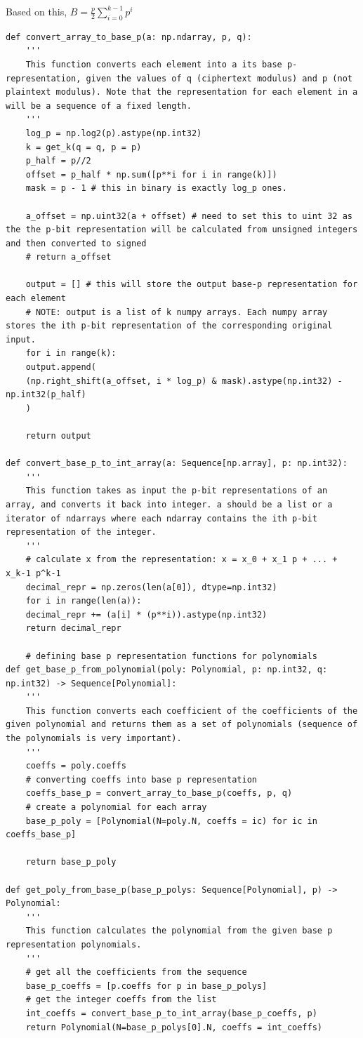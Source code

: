 \documentclass{report}
\begin{document}
	Based on this, $B = \frac{p}{2} \sum\limits_{i=0}^{k-1} p^i$
\begin{verbatim}
def convert_array_to_base_p(a: np.ndarray, p, q):
	'''
	This function converts each element into a its base p-representation, given the values of q (ciphertext modulus) and p (not plaintext modulus). Note that the representation for each element in a will be a sequence of a fixed length.
	'''
	log_p = np.log2(p).astype(np.int32)
	k = get_k(q = q, p = p)
	p_half = p//2
	offset = p_half * np.sum([p**i for i in range(k)])
	mask = p - 1 # this in binary is exactly log_p ones.
	
	a_offset = np.uint32(a + offset) # need to set this to uint 32 as the the p-bit representation will be calculated from unsigned integers and then converted to signed
	# return a_offset
	
	output = [] # this will store the output base-p representation for each element
	# NOTE: output is a list of k numpy arrays. Each numpy array stores the ith p-bit representation of the corresponding original input.
	for i in range(k):
	output.append(
	(np.right_shift(a_offset, i * log_p) & mask).astype(np.int32) - np.int32(p_half)
	)
	
	return output
	
def convert_base_p_to_int_array(a: Sequence[np.array], p: np.int32):
	'''
	This function takes as input the p-bit representations of an array, and converts it back into integer. a should be a list or a iterator of ndarrays where each ndarray contains the ith p-bit representation of the integer.
	'''
	# calculate x from the representation: x = x_0 + x_1 p + ... + x_k-1 p^k-1
	decimal_repr = np.zeros(len(a[0]), dtype=np.int32)
	for i in range(len(a)):
	decimal_repr += (a[i] * (p**i)).astype(np.int32)
	return decimal_repr
	
	# defining base p representation functions for polynomials
def get_base_p_from_polynomial(poly: Polynomial, p: np.int32, q: np.int32) -> Sequence[Polynomial]:
	'''
	This function converts each coefficient of the coefficients of the given polynomial and returns them as a set of polynomials (sequence of the polynomials is very important).
	'''
	coeffs = poly.coeffs
	# converting coeffs into base p representation
	coeffs_base_p = convert_array_to_base_p(coeffs, p, q)
	# create a polynomial for each array
	base_p_poly = [Polynomial(N=poly.N, coeffs = ic) for ic in coeffs_base_p]
	
	return base_p_poly
	
def get_poly_from_base_p(base_p_polys: Sequence[Polynomial], p) -> Polynomial:
	'''
	This function calculates the polynomial from the given base p representation polynomials.
	'''
	# get all the coefficients from the sequence
	base_p_coeffs = [p.coeffs for p in base_p_polys]
	# get the integer coeffs from the list
	int_coeffs = convert_base_p_to_int_array(base_p_coeffs, p)
	return Polynomial(N=base_p_polys[0].N, coeffs = int_coeffs)
\end{verbatim}
	
\end{document}
